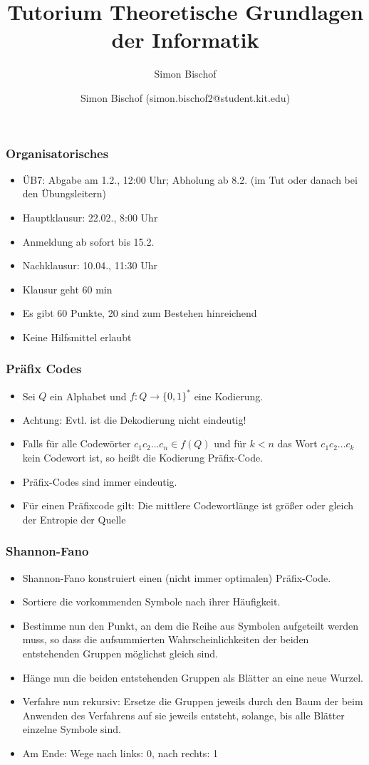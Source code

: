 \documentclass{beamer}
\author{Simon Bischof (simon.bischof2@student.kit.edu)}
\title{Tutorium Theoretische Grundlagen der Informatik}
\subtitle{Simon Bischof}
\institute{Institut f\"{u}r Kryptographie und Sicherheit}
\begin{document}
\begin{frame}
\maketitle
\end{frame}

\begin{frame}
\frametitle{Organisatorisches}
\begin{itemize}
\item ÜB7: Abgabe am 1.2., 12:00 Uhr; Abholung ab 8.2. (im Tut oder danach bei den Übungsleitern) 
\item Hauptklausur: 22.02., 8:00 Uhr
\item Anmeldung ab sofort bis 15.2.
\item Nachklausur: 10.04., 11:30 Uhr
\item Klausur geht 60 min
\item Es gibt 60 Punkte, 20 sind zum Bestehen hinreichend
\item Keine Hilfsmittel erlaubt
\end{itemize}
\end{frame}

\begin{frame}
\frametitle{Präfix Codes}
\begin{itemize}
\item Sei $Q$ ein Alphabet und $f:Q\to \{0,1\}^*$ eine Kodierung.\pause
\item Achtung: Evtl. ist die Dekodierung nicht eindeutig!\pause
\item Falls für alle Codewörter $c_1c_2\ldots c_n\in f(Q)$ und für $k<n$ das Wort $c_1c_2\ldots c_k$ kein Codewort ist, so heißt die Kodierung Präfix-Code.
\item Präfix-Codes sind immer eindeutig.\pause
\item Für einen Präfixcode gilt: Die mittlere Codewortlänge ist größer oder gleich der Entropie der Quelle
\end{itemize}
\end{frame}

\begin{frame}
\frametitle{Shannon-Fano}
\begin{itemize}
\item Shannon-Fano konstruiert einen (nicht immer optimalen) Präfix-Code.
\vspace{1cm}\pause
\item Sortiere die vorkommenden Symbole nach ihrer Häufigkeit.\pause
\item Bestimme nun den Punkt, an dem die Reihe aus Symbolen aufgeteilt
werden muss, so dass die aufsummierten Wahrscheinlichkeiten der beiden
entstehenden Gruppen möglichst gleich sind.\pause
\item Hänge nun die beiden entstehenden Gruppen als Blätter an eine neue
Wurzel.\pause
\item Verfahre nun rekursiv: Ersetze die Gruppen jeweils durch den Baum der
beim Anwenden des Verfahrens auf sie jeweils entsteht, solange, bis alle
Blätter einzelne Symbole sind.\pause
\item Am Ende: Wege nach links: 0, nach rechts: 1
\end{itemize}
\end{frame}
\end{document}
